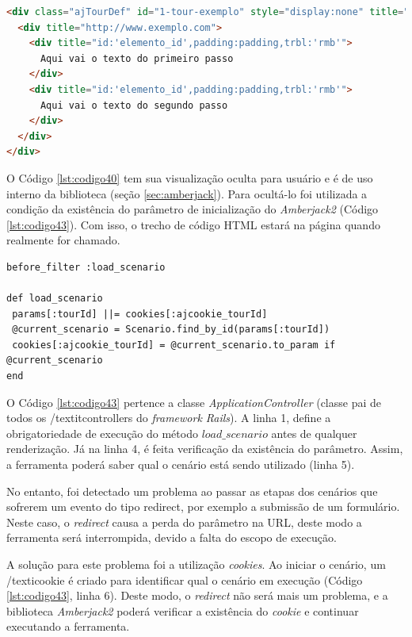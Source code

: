 {\singlespace
\begin{lstlisting}[caption=Cenário descrito em \textit{HTML} para biblioteca \textit{Amberjack2},language=HTML,label={lst:codigo40}]
<div class="ajTourDef" id="1-tour-exemplo" style="display:none" title="/">
  <div title="http://www.exemplo.com">
    <div title="id:'elemento_id',padding:padding,trbl:'rmb'">
      Aqui vai o texto do primeiro passo
    </div>
    <div title="id:'elemento_id',padding:padding,trbl:'rmb'">
      Aqui vai o texto do segundo passo
    </div>
  </div>
</div>

\end{lstlisting}
}

O Código \ref{lst:codigo40} tem sua visualização oculta para usuário e é de uso interno da biblioteca (seção \ref{sec:amberjack}). Para ocultá-lo foi utilizada a condição da existência do parâmetro de inicialização do \textit{Amberjack2} (Código \ref{lst:codigo43}). Com isso, o trecho de código HTML estará na página quando realmente for chamado.

{\singlespace
\begin{lstlisting}[caption=Método para carregar o cenário,label={lst:codigo43}]
before_filter :load_scenario

def load_scenario
 params[:tourId] ||= cookies[:ajcookie_tourId]
 @current_scenario = Scenario.find_by_id(params[:tourId])
 cookies[:ajcookie_tourId] = @current_scenario.to_param if @current_scenario
end
\end{lstlisting}
}

O Código \ref{lst:codigo43} pertence a classe \textit{ApplicationController} (classe pai de todos os /textit{controllers} do \textit{framework Rails}). A linha 1, define a obrigatoriedade de execução do método \textit{$load\_scenario$} antes de qualquer renderização. Já na linha 4, é feita verificação da existência do parâmetro. Assim, a ferramenta poderá saber qual o cenário está sendo utilizado (linha 5).

No entanto, foi detectado um problema ao passar as etapas dos cenários que sofrerem um evento do tipo redirect\footnotemark[1], por exemplo a submissão de um formulário. Neste caso, o \textit{redirect} causa a perda do parâmetro na URL, deste modo a ferramenta será interrompida, devido a falta do escopo de execução.

A solução para este problema foi a utilização \textit{cookies}\footnotemark[2]. Ao iniciar o cenário, um /texti{cookie} é criado para identificar qual o cenário em execução (Código \ref{lst:codigo43}, linha 6). Deste modo, o \textit{redirect} não será mais um problema, e a biblioteca \textit{Amberjack2} poderá verificar a existência do \textit{cookie} e continuar executando a ferramenta.

